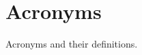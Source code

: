 
\chapter*{Acronyms}\label{ch:acronyms}

Acronyms and their definitions.

\begin{sortedList}
\end{sortedList}
